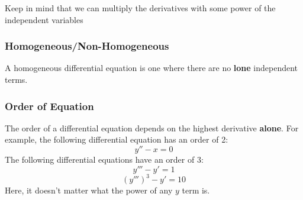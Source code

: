 \documentclass[letterpaper]{article}
\begin{document}
Keep in mind that we can multiply the derivatives with some power of the independent variables 


\subsubsection{Homogeneous/Non-Homogeneous}
A homogeneous differential equation is one where there are no \textbf{lone} independent terms. 

\subsubsection{Order of Equation}
The order of a differential equation depends on the highest derivative \textbf{alone}. For example, the following differential equation has an order of 2:
\[y'' - x = 0\]
The following differential equations have an order of 3:
\[y''' - y'  = 1\]
\[(y''')^3 - y' = 10\]
Here, it doesn't matter what the power of any $y$ term is. 
\end{document}

